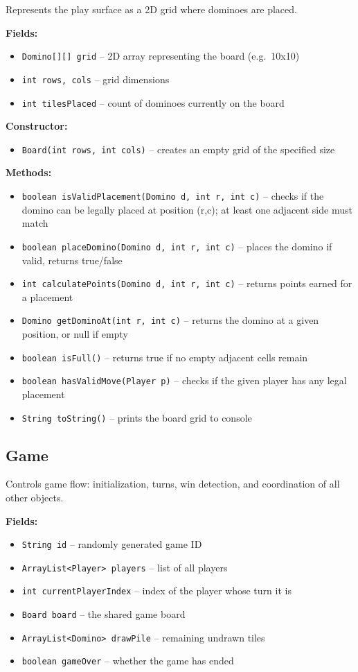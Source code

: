 \documentclass[11pt,a4paper]{article}
\begin{document}
Represents the play surface as a 2D grid where dominoes are placed.

\textbf{Fields:}
\begin{itemize}[nosep]
  \item \texttt{Domino[][] grid} -- 2D array representing the board (e.g.\ 10x10)
  \item \texttt{int rows, cols} -- grid dimensions
  \item \texttt{int tilesPlaced} -- count of dominoes currently on the board
\end{itemize}

\textbf{Constructor:}
\begin{itemize}[nosep]
  \item \texttt{Board(int rows, int cols)} -- creates an empty grid of the specified size
\end{itemize}

\textbf{Methods:}
\begin{itemize}[nosep]
  \item \texttt{boolean isValidPlacement(Domino d, int r, int c)} -- checks if the domino can be legally placed at position (r,c); at least one adjacent side must match
  \item \texttt{boolean placeDomino(Domino d, int r, int c)} -- places the domino if valid, returns true/false
  \item \texttt{int calculatePoints(Domino d, int r, int c)} -- returns points earned for a placement
  \item \texttt{Domino getDominoAt(int r, int c)} -- returns the domino at a given position, or null if empty
  \item \texttt{boolean isFull()} -- returns true if no empty adjacent cells remain
  \item \texttt{boolean hasValidMove(Player p)} -- checks if the given player has any legal placement
  \item \texttt{String toString()} -- prints the board grid to console
\end{itemize}

\subsection{Game}

Controls game flow: initialization, turns, win detection, and coordination of all other objects.

\textbf{Fields:}
\begin{itemize}[nosep]
  \item \texttt{String id} -- randomly generated game ID
  \item \texttt{ArrayList<Player> players} -- list of all players
  \item \texttt{int currentPlayerIndex} -- index of the player whose turn it is
  \item \texttt{Board board} -- the shared game board
  \item \texttt{ArrayList<Domino> drawPile} -- remaining undrawn tiles
  \item \texttt{boolean gameOver} -- whether the game has ended
\end{itemize}
\end{document}
